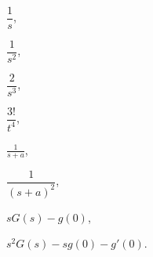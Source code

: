 {\begin{abc}
%
%
\end{abc}
}



{
\begin{multicols}{3}
\begin{iii}
\item $\dfrac{1}{s}$,
\item $\dfrac{1}{s^2}$,
\item $\dfrac{2}{s^3}$,
\item $\dfrac{3!}{t^4}$,
\item $\frac{1}{s+a}$,
\item $\dfrac{1}{(s+a)^2}$,
\item $ sG(s) - g(0)$,
\item $ s^2G(s) - sg(0) - g'(0)$.
\end{iii}
\end{multicols}
}
